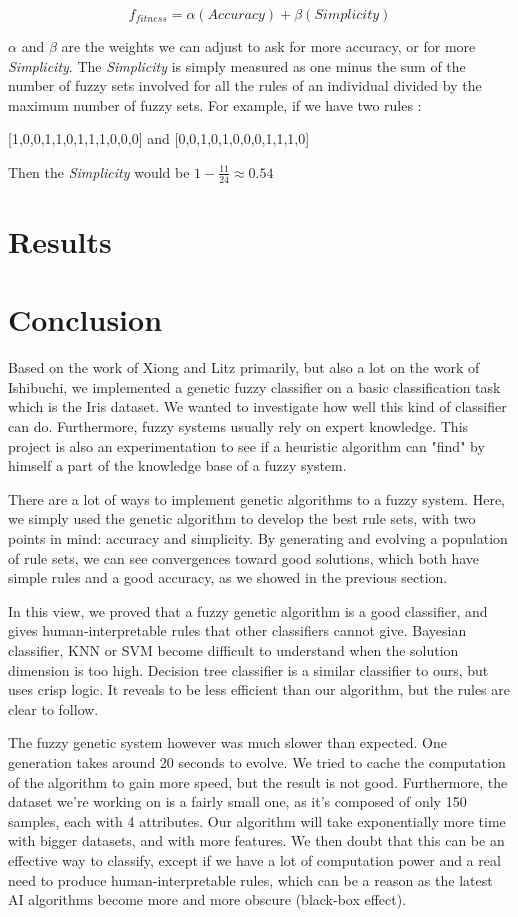 \documentclass[a4paper,12pt]{article}
\begin{document}
\[f_{fitness}=\alpha (Accuracy)+\beta(Simplicity)\]

$\alpha$ and $\beta$ are the weights we can adjust to ask for more accuracy, or for more \textit{Simplicity}.
The \textit{Simplicity} is simply measured as one minus the sum of the number of fuzzy sets involved for all the rules of an individual divided by the maximum number of fuzzy sets. 
For example, if we have two rules :
\begin{center}[1,0,0,1,1,0,1,1,1,0,0,0] and [0,0,1,0,1,0,0,0,1,1,1,0]
\end{center}
Then the \textit{Simplicity} would be $1 - \frac{11}{24} \approx 0.54	$


\section{Results}


\section{Conclusion}

Based on the work of Xiong and Litz primarily, but also a lot on the work of Ishibuchi, we implemented a genetic fuzzy classifier on a basic classification task which is the Iris dataset.
We wanted to investigate how well this kind of classifier can do. Furthermore, fuzzy systems usually rely on expert knowledge. This project is also an experimentation to see if a heuristic algorithm can "find" by himself a part of the knowledge base of a fuzzy system.

There are a lot of ways to implement genetic algorithms to a fuzzy system. Here, we simply used the genetic algorithm to develop the best rule sets, with two points in mind: accuracy and simplicity.
By generating and evolving a population of rule sets, we can see convergences toward good solutions, which both have simple rules and a good accuracy, as we showed in the previous section.

In this view, we proved that a fuzzy genetic algorithm is a good classifier, and gives human-interpretable rules that other classifiers cannot give. Bayesian classifier, KNN or SVM become difficult to understand when the solution dimension is too high.
Decision tree classifier is a similar classifier to ours, but uses crisp logic. It reveals to be less efficient than our algorithm, but the rules are clear to follow.

The fuzzy genetic system however was much slower than expected. One generation takes around 20 seconds to evolve. We tried to cache the computation of the algorithm to gain more speed, but the result is not good. Furthermore, the dataset we're working on is a fairly small one, as it's composed of only 150 samples, each with 4 attributes. Our algorithm will take exponentially more time with bigger datasets, and with more features. We then doubt that this can be an effective way to classify, except if we have a lot of computation power and a real need to produce human-interpretable rules, which can be a reason as the latest AI algorithms become more and more obscure (black-box effect).
\end{document}
